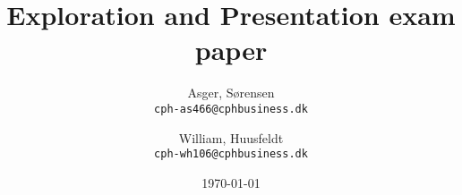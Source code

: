 \documentclass[10pt]{report}
\title{Exploration and Presentation exam paper}
\author{
    Asger, Sørensen\\
    \texttt{cph-as466@cphbusiness.dk}\\
    \and
    William, Huusfeldt\\
    \texttt{cph-wh106@cphbusiness.dk}\\
  }
\date{\today}
\begin{document}
\hypersetup{pageanchor=false}
\begin{titlepage}
\maketitle
\end{titlepage}
\end{document}
